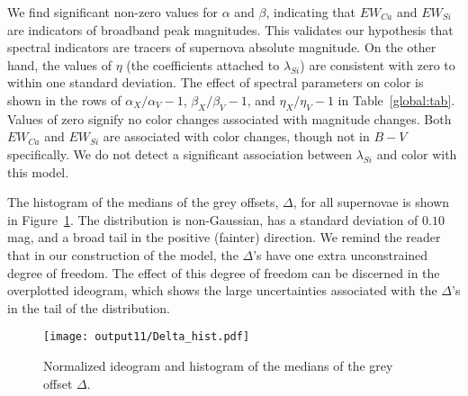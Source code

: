 \documentclass{aastex61}   	%
\begin{document}
We find significant non-zero values for $\alpha$ and $\beta$, indicating that $EW_{Ca}$ and $EW_{Si}$ are indicators of broadband
peak magnitudes.
This validates our hypothesis that spectral indicators
are tracers of supernova absolute magnitude.  On the other hand, the values of $\eta$ (the coefficients attached to $\lambda_{Si}$) are consistent with zero
to  within one standard deviation.
The effect of spectral parameters on color is shown in the rows of $\alpha_X/\alpha_V-1$,  $\beta_X/\beta_V-1$, and  $\eta_X/\eta_V-1$
in Table~\ref{global:tab}.
Values of zero signify no color changes associated with magnitude changes.
Both $EW_{Ca}$ and $EW_{Si}$ are associated with color changes, though not in $B-V$ specifically.
We do not detect a significant association between
$\lambda_{Si}$ and color with this model.


The histogram of the medians of the grey offsets, $\Delta$, for all supernovae is shown in Figure~\ref{hist:fig}.  The distribution is non-Gaussian, 
has a standard deviation of
$0.10$
mag, and a broad tail in the positive (fainter) direction. 
\color{orange}
We remind the reader that in our construction of the model, the $\Delta$'s have one extra unconstrained degree of freedom.
The effect of this degree of freedom can be discerned in the overplotted ideogram, which shows the large uncertainties associated 
with the $\Delta$'s in the tail of the distribution.
\color{black}
\begin{figure}[htbp] %
   \centering
   \texttt{[image: output11/Delta\_hist.pdf]} 
   \caption{Normalized ideogram and histogram of the medians of the grey offset $\Delta$. 
   \label{hist:fig}}
\end{figure}
\end{document}
